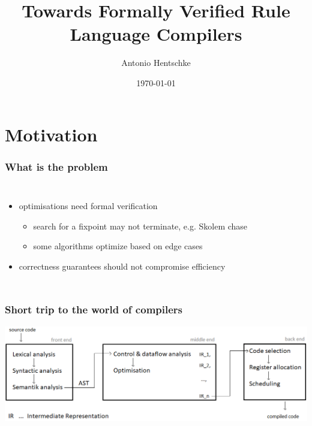 \documentclass[aspectratio=169]{beamer}
\title{Towards Formally Verified Rule Language Compilers}
\author{Antonio Hentschke}
\date{\today}
\begin{document}
\begin{frame}
	\titlepage
\end{frame}



\section{Motivation}




\begin{frame}
	\frametitle{What is the problem}
	
	\begin{columns}
		\begin{itemize}
		\item optimisations need formal verification
			\begin{itemize}
			\item search for a fixpoint may not terminate, e.g. Skolem chase
			\item some algorithms optimize based on edge cases
			\end{itemize}
		\item correctness guarantees should not compromise efficiency
		\end{itemize}
		
	\end{columns}
	
\end{frame}



\begin{frame}
	\frametitle{Short trip to the world of compilers}
	\includegraphics[scale=.5]{figures/compiler.png}
\end{frame}
\end{document}
